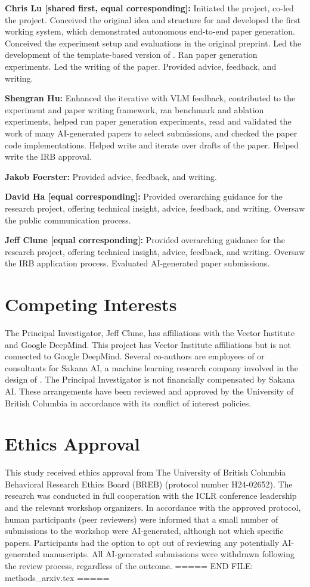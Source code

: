 \textbf{Chris Lu [shared first, equal corresponding]:} Initiated the project, co-led the project. Conceived the original idea and structure for \ouralgo and developed the first working system, which demonstrated autonomous end-to-end paper generation. Conceived the experiment setup and evaluations in the original preprint. Led the development of the template-based version of \ouralgo. Ran paper generation experiments. Led the writing of the paper. Provided advice, feedback, and writing.

\textbf{Shengran Hu:} Enhanced the iterative \ourreviewer with VLM feedback, contributed to the experiment and paper writing framework, ran \ourreviewer benchmark and ablation experiments, helped run paper generation experiments, read and validated the work of many AI-generated papers to select submissions, and checked the paper code implementations. Helped write and iterate over drafts of the paper. Helped write the IRB approval.

\textbf{Jakob Foerster:} Provided advice, feedback, and writing.

\textbf{David Ha [equal corresponding]:} Provided overarching guidance for the research project, offering technical insight, advice, feedback, and writing. Oversaw the public communication process.

\textbf{Jeff Clune [equal corresponding]:} Provided overarching guidance for the research project, offering technical insight, advice, feedback, and writing. Oversaw the IRB application process. Evaluated AI-generated paper submissions.

\section*{Competing Interests}
The Principal Investigator, Jeff Clune, has affiliations with the Vector Institute and Google DeepMind.
This project has Vector Institute affiliations but is not connected to Google DeepMind.
Several co-authors are employees of or consultants for Sakana AI, a machine learning research company involved in the design of \ouralgo.
The Principal Investigator is not financially compensated by Sakana AI.
These arrangements have been reviewed and approved by the University of British Columbia in accordance with its conflict of interest policies.

\section*{Ethics Approval}
This study received ethics approval from The University of British Columbia Behavioral Research Ethics Board (BREB) (protocol number H24-02652).
The research was conducted in full cooperation with the ICLR conference leadership and the relevant workshop organizers.
In accordance with the approved protocol, human participants (peer reviewers) were informed that a small number of submissions to the workshop were AI-generated, although not which specific papers.
Participants had the option to opt out of reviewing any potentially AI-generated manuscripts.
All AI-generated submissions were withdrawn following the review process, regardless of the outcome.
===== END FILE: methods_arxiv.tex =====

